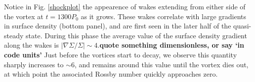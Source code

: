 Notice in Fig. \ref{shockplot} the appearence of wakes extending from
either side of the vortex at $t=1300P_0$ as it grows. These 
wakes correlate with large gradients in surface density (bottom
panel), and are first seen in the later half of the quasi-steady state.       
During this phase the average value of the surface density gradient
along the wakes is $|\nabla\Sigma/\Sigma| \sim 4 $.{\bf quote something
  dimensionless, or say `in code units'}  
Just before the vortices start to decay, we observe this quantity
sharply increases to $ \sim 6 $, and remains around this value
until the vortex dies out, at which point the 
associated Rossby number quickly approaches zero.  

\begin{figure}
\hfill
\hfill
   \\[-0.98cm]
\end{figure}

